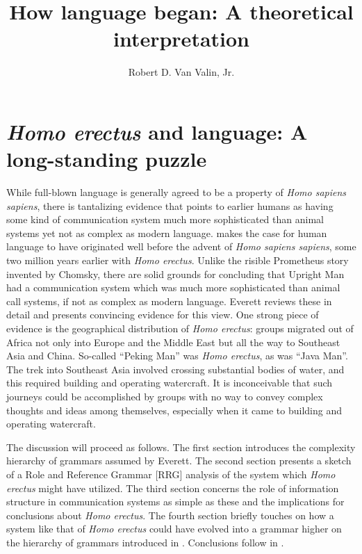 \documentclass[output=paper,colorlinks,citecolor=brown]{langscibook}
\author[Robert D. {Van Valin, Jr.}]{Robert D. Van Valin, Jr.\orcid{}\affiliation{The State University of New York at Buffalo \& Heinrich Heine University Düsseldorf}}
\title{How language began: A theoretical interpretation}
\begin{document}
\maketitle

\section{\emph{Homo erectus} and language: A long-standing puzzle}
While full-blown language is generally agreed to be a property of \emph{Homo sapiens sapiens}, there is tantalizing evidence that points to earlier humans as having some kind of communication system much more sophisticated than animal systems yet not as complex as modern language. \citet{everett2017language} makes the case for human language to have originated well before the advent of \emph{Homo sapiens sapiens}, some two million years earlier with \emph{Homo erectus}. Unlike the risible Prometheus story invented by Chomsky, there are solid grounds for concluding that Upright Man had a communication system which was much more sophisticated than animal call systems, if not as complex as modern language.  Everett reviews these in detail and presents convincing evidence for this view.  One strong piece of evidence is the geographical distribution of \emph{Homo erectus}: groups migrated out of Africa not only into Europe and the Middle East but all the way to Southeast Asia and China.  So-called ``Peking Man'' was \emph{Homo erectus}, as was ``Java Man''.  The trek into Southeast Asia involved crossing substantial bodies of water, and this required building and operating watercraft.  It is inconceivable that such journeys could be accomplished by groups with no way to convey complex thoughts and ideas among themselves, especially when it came to building and operating watercraft.  

The discussion will proceed as follows. The first section introduces the complexity hierarchy of grammars assumed by Everett.  The second section presents a sketch of a Role and Reference Grammar [RRG] \citep{van2005exploring,van1997syntax} analysis of the system which \emph{Homo erectus} might have utilized.  The third section concerns the role of information structure in communication systems as simple as these and the implications for conclusions about \emph{Homo erectus}.  The fourth section briefly touches on how a system like that of \emph{Homo erectus} could have evolved into a grammar higher on the hierarchy of grammars introduced in . Conclusions follow in .
\end{document}
